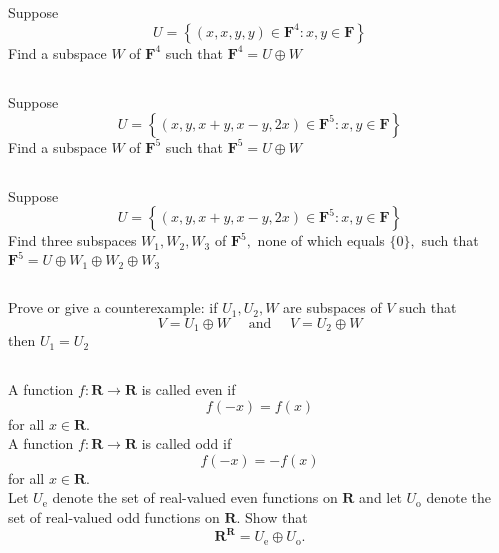 \documentclass[a4paper]{article}
\begin{document}
\subsection{}
Suppose
\[
    U=\left\{(x, x, y, y) \in \mathbf{F}^{4}: x, y \in \mathbf{F}\right\}
\]
Find a subspace $W$ of $\mathbf{F}^{4}$ such that $\mathbf{F}^{4}=U \oplus W$
\paragraph{}

\subsection{}
Suppose
\[
    U=\left\{(x, y, x+y, x-y, 2 x) \in \mathbf{F}^{5}: x, y \in \mathbf{F}\right\}
\]
Find a subspace $W$ of $\mathbf{F}^{5}$ such that $\mathbf{F}^{5}=U \oplus W$
\paragraph{}

\subsection{}
Suppose
\[
    U=\left\{(x, y, x+y, x-y, 2 x) \in \mathbf{F}^{5}: x, y \in \mathbf{F}\right\}
\]
Find three subspaces $W_{1}, W_{2}, W_{3}$ of $\mathbf{F}^{5},$ none of which equals $\{0\},$ such that $\mathbf{F}^{5}=U \oplus W_{1} \oplus W_{2} \oplus W_{3}$
\paragraph{}

\subsection{}
Prove or give a counterexample: if $U_{1}, U_{2}, W$ are subspaces of $V$ such that
\[
    V=U_{1} \oplus W \quad \text { and } \quad V=U_{2} \oplus W
\]
then $U_{1}=U_{2}$
\paragraph{}

\subsection{}
A function $f: \mathbf{R} \rightarrow \mathbf{R}$ is called even if
\[
    f(-x)=f(x)
\]
for all $x \in \mathbf{R} .$ \\
A function $f: \mathbf{R} \rightarrow \mathbf{R}$ is called odd if
\[
    f(-x)=-f(x)
\]
for all $x \in \mathbf{R} .$ \\
Let $U_{\mathrm{e}}$ denote the set of real-valued even functions on $\mathbf{R}$ and let $U_{\mathrm{o}}$ denote the set of real-valued odd functions on $\mathbf{R}$. Show that
\[
    \mathbf{R}^{\mathbf{R}}=U_{\mathrm{e}} \oplus U_{\mathrm{o}}.
\]
\paragraph{}
\end{document}
